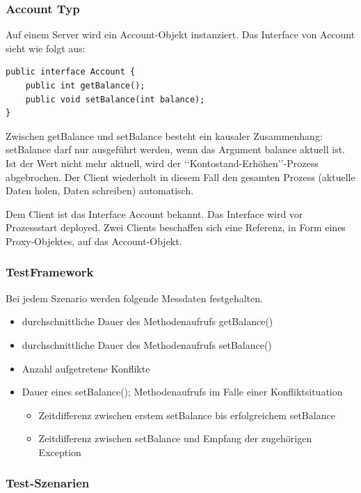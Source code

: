 \documentclass{article}
\begin{document}
\subsubsection{Account Typ}
\label{sec:account-typ}

Auf einem Server wird ein Account-Objekt instanziert.
Das Interface von Account sieht wie folgt aus:
\begin{lstlisting}
public interface Account {
    public int getBalance();
    public void setBalance(int balance);    
}
\end{lstlisting}
Zwischen getBalance und setBalance besteht ein kausaler Zusammenhang: setBalance darf nur ausgeführt werden, wenn das Argument balance aktuell ist. Ist der Wert nicht mehr aktuell, wird der ‘‘Kontostand-Erhöhen’’-Prozess abgebrochen. Der Client wiederholt in diesem Fall den gesamten Prozess (aktuelle Daten holen, Daten schreiben) automatisch.

Dem Client ist das Interface Account bekannt. Das Interface wird vor Prozessstart deployed.
Zwei Clients beschaffen sich eine Referenz, in Form eines Proxy-Objektes, auf das Account-Objekt. 

\subsubsection{TestFramework}
\label{sec:testframework-1}


Bei jedem Szenario werden folgende Messdaten festgehalten.
\begin{itemize}
\item durchschnittliche Dauer des Methodenaufrufs getBalance()
\item durchschnittliche Dauer des Methodenaufrufs setBalance()
\item Anzahl aufgetretene Konflikte
\item Dauer eines setBalance(); Methodenaufrufs im Falle einer Konfliktsituation
  \begin{itemize}
  \item Zeitdifferenz zwischen erstem setBalance bis erfolgreichem setBalance
  \item Zeitdifferenz zwischen setBalance und Empfang der zugehörigen Exception
  \end{itemize}
\end{itemize}

\subsubsection{Test-Szenarien}
\label{sec:test-szenarien}
\end{document}
